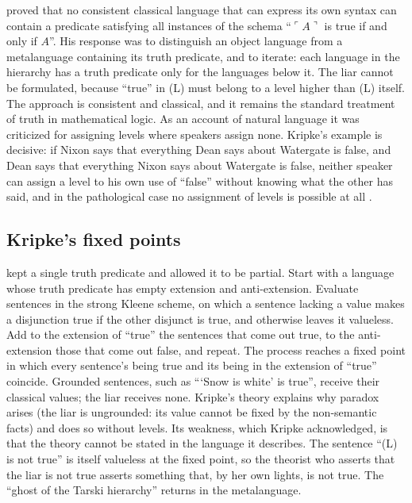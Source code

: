 \documentclass{situationist-preprint}
\begin{document}
\citet{Tarski1935} proved that no consistent classical language that can express its own syntax can contain a predicate satisfying all instances of the schema \enquote{$\ulcorner A \urcorner$ is true if and only if $A$}. His response was to distinguish an object language from a metalanguage containing its truth predicate, and to iterate: each language in the hierarchy has a truth predicate only for the languages below it. The liar cannot be formulated, because \enquote{true} in (L) must belong to a level higher than (L) itself. The approach is consistent and classical, and it remains the standard treatment of truth in mathematical logic. As an account of natural language it was criticized for assigning levels where speakers assign none. Kripke's example is decisive: if Nixon says that everything Dean says about Watergate is false, and Dean says that everything Nixon says about Watergate is false, neither speaker can assign a level to his own use of \enquote{false} without knowing what the other has said, and in the pathological case no assignment of levels is possible at all \citep{Kripke1975}.

\subsection{Kripke's fixed points}

\citet{Kripke1975} kept a single truth predicate and allowed it to be partial. Start with a language whose truth predicate has empty extension and anti-extension. Evaluate sentences in the strong Kleene scheme, on which a sentence lacking a value makes a disjunction true if the other disjunct is true, and otherwise leaves it valueless. Add to the extension of \enquote{true} the sentences that come out true, to the anti-extension those that come out false, and repeat. The process reaches a fixed point in which every sentence's being true and its being in the extension of \enquote{true} coincide. Grounded sentences, such as \enquote{\enquote{Snow is white} is true}, receive their classical values; the liar receives none. Kripke's theory explains why paradox arises (the liar is ungrounded: its value cannot be fixed by the non-semantic facts) and does so without levels. Its weakness, which Kripke acknowledged, is that the theory cannot be stated in the language it describes. The sentence \enquote{(L) is not true} is itself valueless at the fixed point, so the theorist who asserts that the liar is not true asserts something that, by her own lights, is not true. The \enquote{ghost of the Tarski hierarchy} returns in the metalanguage.
\end{document}

